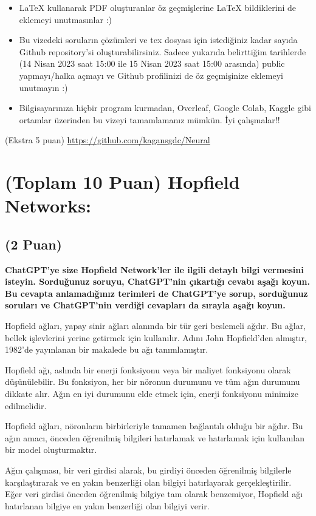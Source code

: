 \documentclass[11pt]{article}
\begin{document}
\begin{itemize}
    \item LaTeX kullanarak PDF oluşturanlar öz geçmişlerine LaTeX bildiklerini de eklemeyi unutmasınlar :)
    \item Bu vizedeki soruların çözümleri ve tex dosyası için istediğiniz kadar sayıda Github repository'si oluşturabilirsiniz. Sadece yukarıda belirttiğim tarihlerde (14 Nisan 2023 saat 15:00 ile 15 Nisan 2023 saat 15:00 arasında) public yapmayı/halka açmayı ve Github profilinizi de öz geçmişinize eklemeyi unutmayın :)
    \item Bilgisayarınıza hiçbir program kurmadan, Overleaf, Google Colab, Kaggle gibi ortamlar üzerinden bu vizeyi tamamlamanız mümkün. İyi çalışmalar!!
\end{itemize}

(Ekstra 5 puan) \url{https://github.com/kagansgdc/Neural}

\newpage
\section{(Toplam 10 Puan) Hopfield Networks:}

\subsection{(2 Puan)} \textbf{ChatGPT’ye size Hopfield Network’ler ile ilgili detaylı bilgi vermesini isteyin. Sorduğunuz soruyu, ChatGPT'nin çıkartığı cevabı aşağı koyun. Bu cevapta anlamadığınız terimleri de ChatGPT’ye sorup, sorduğunuz soruları ve ChatGPT’nin verdiği cevapları da sırayla aşağı koyun.}

Hopfield ağları, yapay sinir ağları alanında bir tür geri beslemeli ağdır. Bu ağlar, bellek işlevlerini yerine getirmek için kullanılır. Adını John Hopfield'den almıştır, 1982'de yayınlanan bir makalede bu ağı tanımlamıştır.

Hopfield ağı, aslında bir enerji fonksiyonu veya bir maliyet fonksiyonu olarak düşünülebilir. Bu fonksiyon, her bir nöronun durumunu ve tüm ağın durumunu dikkate alır. Ağın en iyi durumunu elde etmek için, enerji fonksiyonu minimize edilmelidir.

Hopfield ağları, nöronların birbirleriyle tamamen bağlantılı olduğu bir ağdır. Bu ağın amacı, önceden öğrenilmiş bilgileri hatırlamak ve hatırlamak için kullanılan bir model oluşturmaktır.

Ağın çalışması, bir veri girdisi alarak, bu girdiyi önceden öğrenilmiş bilgilerle karşılaştırarak ve en yakın benzerliği olan bilgiyi hatırlayarak gerçekleştirilir. Eğer veri girdisi önceden öğrenilmiş bilgiye tam olarak benzemiyor, Hopfield ağı hatırlanan bilgiye en yakın benzerliği olan bilgiyi verir.
\end{document}
